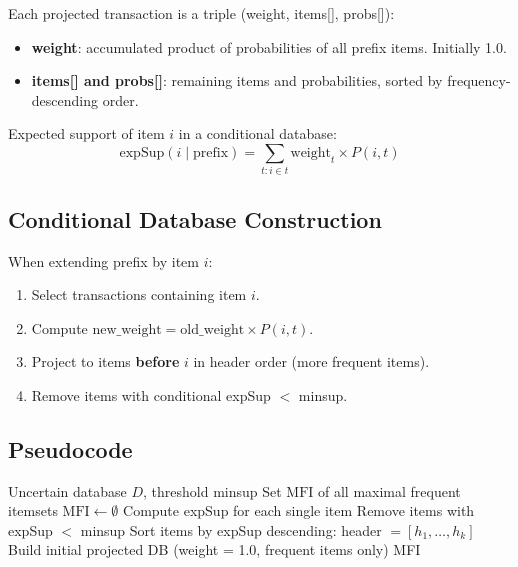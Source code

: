 \documentclass[12pt,a4paper]{report}
\begin{document}
  Each projected transaction is a triple (weight, items[], probs[]):
  \begin{itemize}
    \item \textbf{weight}: accumulated product of probabilities of all prefix items. Initially 1.0.
    \item \textbf{items[] and probs[]}: remaining items and probabilities, sorted by frequency-descending order.
  \end{itemize}

  Expected support of item $i$ in a conditional database:
  \begin{equation}
    \text{expSup}(i \mid \text{prefix}) = \sum_{t : i \in t} \text{weight}_t \times P(i, t)
  \end{equation}

  \subsection{Conditional Database Construction}

  When extending prefix by item $i$:
  \begin{enumerate}
    \item Select transactions containing item $i$.
    \item Compute $\text{new\_weight} = \text{old\_weight} \times P(i, t)$.
    \item Project to items \textbf{before} $i$ in header order (more frequent items).
    \item Remove items with conditional expSup $<$ minsup.
  \end{enumerate}

  \subsection{Pseudocode}

  \begin{algorithm}[H]
\caption{UFPMax}
\begin{algorithmic}[1]
  \Require Uncertain database $D$, threshold minsup
  \Ensure Set $\text{MFI}$ of all maximal frequent itemsets
  \State $\text{MFI} \gets \emptyset$
  \State Compute expSup for each single item
  \State Remove items with expSup $<$ minsup
  \State Sort items by expSup descending: header $= [h_1, \ldots, h_k]$
  \State Build initial projected DB (weight = 1.0, frequent items only)
  \State {}
  \State \Return MFI
\end{algorithmic}
  \end{algorithm}
\end{document}
